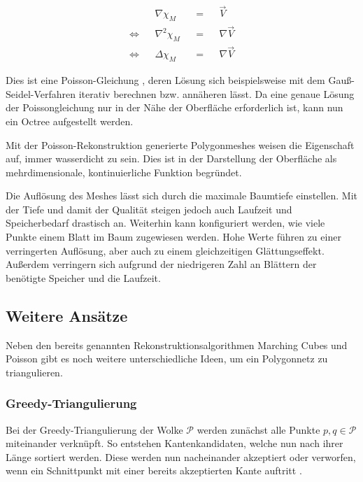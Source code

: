 \begin{displaymath}
\begin{aligned}
&&\nabla \chi_M && = &&\overrightarrow{V}\\
\Leftrightarrow && \nabla^2 \chi_M && = &&\nabla \overrightarrow{V}\\
\Leftrightarrow && \Delta \chi_M && = &&\nabla \overrightarrow{V}
\end{aligned}
\end{displaymath}

Dies ist eine Poisson-Gleichung \cite[Kap. 2]{ponce2016pde}, deren Lösung sich beispielsweise mit dem Gauß-Seidel-Verfahren iterativ berechnen bzw. annäheren lässt.
Da eine genaue Lösung der Poissongleichung nur in der Nähe der Oberfläche erforderlich ist, kann nun ein Octree aufgestellt werden.

Mit der Poisson-Rekonstruktion generierte Polygonmeshes weisen die Eigenschaft auf, immer wasserdicht zu sein.
Dies ist in der Darstellung der Oberfläche als mehrdimensionale, kontinuierliche Funktion begründet.

Die Auflösung des Meshes lässt sich durch die maximale Baumtiefe einstellen.
Mit der Tiefe und damit der Qualität steigen jedoch auch Laufzeit und Speicherbedarf drastisch an.
Weiterhin kann konfiguriert werden, wie viele Punkte einem Blatt im Baum zugewiesen werden.
Hohe Werte führen zu einer verringerten Auflösung, aber auch zu einem gleichzeitigen Glättungseffekt.
Außerdem verringern sich aufgrund der niedrigeren Zahl an Blättern der benötigte Speicher und die Laufzeit.


\subsection{Weitere Ansätze}
\label{subsec:triangulation-others}
Neben den bereits genannten Rekonstruktionsalgorithmen Marching Cubes und Poisson gibt es noch weitere unterschiedliche Ideen, um ein Polygonnetz zu triangulieren.

\subsubsection{Greedy-Triangulierung}
\label{subsubsec:greedy-triangulierung}

Bei der Greedy-Triangulierung der Wolke $\mathcal{P}$ werden zunächst alle Punkte $p, q \in \mathcal{P}$ miteinander verknüpft.
So entstehen Kantenkandidaten, welche nun nach ihrer Länge sortiert werden.
Diese werden nun nacheinander akzeptiert oder verworfen, wenn ein Schnittpunkt mit einer bereits akzeptierten Kante auftritt \cite[235--237]{preparata1985computational}.

